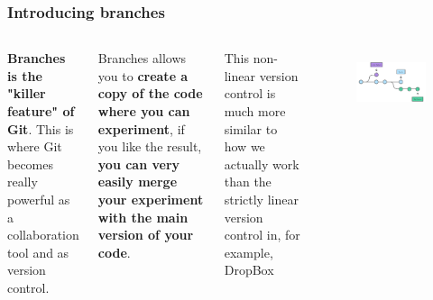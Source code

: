 \documentclass[aspectratio=169]{beamer} %
\begin{document}
\begin{frame}
\frametitle{Introducing branches}

	\begin{columns}[c] 
		
		\textbf{Branches is the "killer feature" of Git}. This is where Git becomes really powerful as a collaboration tool and as version control.
		
		\vspace{.25cm}
	
		Branches allows you to \textbf{create a copy of the code where you can experiment}, if you like the result, \textbf{you can very easily merge your experiment with the main version of your code}.
		
		\vspace{.25cm}
		
		This non-linear version control is much more similar to how we actually work than the strictly linear version control in, for example, DropBox
		
		\begin{figure}
			\centering
			\includegraphics[width=1\linewidth]{../../Common-Resources/img/branches}
			\label{fig:branches}
		\end{figure}
		
	\end{columns}

\end{frame}
\end{document}
